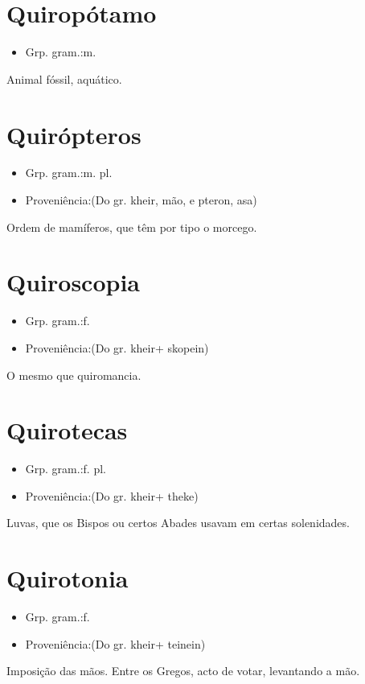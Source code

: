 \section{Quiropótamo}
\begin{itemize}
\item {Grp. gram.:m.}
\end{itemize}
Animal fóssil, aquático.
\section{Quirópteros}
\begin{itemize}
\item {Grp. gram.:m. pl.}
\end{itemize}
\begin{itemize}
\item {Proveniência:(Do gr. \textunderscore kheir\textunderscore , mão, e \textunderscore pteron\textunderscore , asa)}
\end{itemize}
Ordem de mamíferos, que têm por tipo o morcego.
\section{Quiroscopia}
\begin{itemize}
\item {Grp. gram.:f.}
\end{itemize}
\begin{itemize}
\item {Proveniência:(Do gr. \textunderscore kheir\textunderscore  + \textunderscore skopein\textunderscore )}
\end{itemize}
O mesmo que \textunderscore quiromancia\textunderscore .
\section{Quirotecas}
\begin{itemize}
\item {Grp. gram.:f. pl.}
\end{itemize}
\begin{itemize}
\item {Proveniência:(Do gr. \textunderscore kheir\textunderscore  + \textunderscore theke\textunderscore )}
\end{itemize}
Luvas, que os Bispos ou certos Abades usavam em certas solenidades.
\section{Quirotonia}
\begin{itemize}
\item {Grp. gram.:f.}
\end{itemize}
\begin{itemize}
\item {Proveniência:(Do gr. \textunderscore kheir\textunderscore  + \textunderscore teinein\textunderscore )}
\end{itemize}
Imposição das mãos.
Entre os Gregos, acto de votar, levantando a mão.
